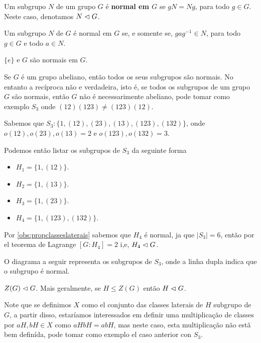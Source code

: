 \begin{definition}
  Um subgrupo $N$ de um grupo $G$ é \textbf{normal em $G$} se $gN=Ng$, para todo $g\in G$. Neste caso, denotamos $N\vartriangleleft G$.  
\end{definition}
\begin{proposition}
  Um subgrupo $N$ de $G$ é normal em $G$ se, e somente se, $gag^{-1}\in N$, para todo $g\in G$ e todo $a\in N$.   
\end{proposition}
\begin{example}
  $\{e\}$ e $G$ são normais em $G$. 
\end{example}
\begin{example}
  Se $G$ é um grupo abeliano, então todos os seus subgrupos são normais. No entanto a recíproca não e verdadeira, isto é, se todos os subgrupos de um grupo $G$ são normais, então $G$ não é necessarimente abeliano, pode tomar como exemplo $S_3$ onde $(12)(123)\neq(123)(12)$.
\end{example}
\begin{note}[Subgrupos do $S_3$]\label{note:subgrupos-s3}
Sabemos que $S_3:\{1,(12),(23),(13),(123),(132)\}$, onde $o(12),o(23),o(13)=2$ e $o(123),o(132)=3$.

Podemos então listar os subgrupos de $S_3$ da seguinte forma
\begin{itemize}
  \item $H_1=\{1,(12)\}$.
  \item $H_2=\{1,(13)\}$.
  \item $H_3=\{1,(23)\}$.
  \item $H_4=\{1,(123),(132)\}$.
\end{itemize}
Por \ref{obs:propclasseslaterais} sabemos que $H_4$ é normal, ja que $|S_3|=6$, então por el teorema de Lagrange $[G:H_4]=2$ i,e, $H_4\vartriangleleft G$.

O diagrama a seguir representa os subgrupos de $S_3$, onde a linha dupla indica que o subgrupo é normal.
\begin{center}
    
\end{center}
\end{note}
\begin{example}
  $Z(G)\vartriangleleft G$. Mais geralmente, se $H\leq Z(G)$ então $H\vartriangleleft G$. 
\end{example}
Note que se definimos $X$ como el conjunto das classes laterais de $H$ subgrupo de $G$, a partir disso, estaríamos interessados em definir uma multiplicação de classes por $aH,bH\in X$ como $aHbH=abH$, mas neste caso, esta multiplicação não estã bem definída, pode tomar como exemplo el caso anterior con $S_3$.\\
